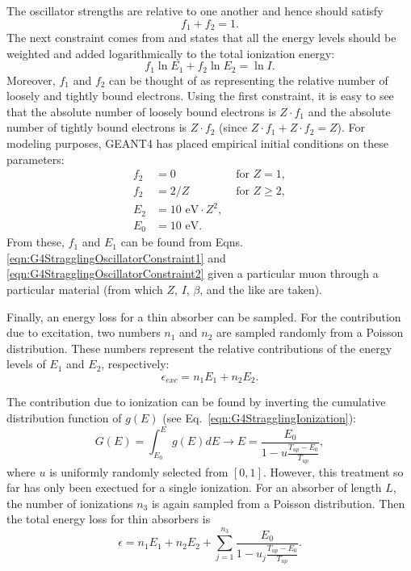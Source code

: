 The oscillator strengths are relative to one another and hence should satisfy
\begin{equation}\label{eqn:G4StragglingOscillatorConstraint1}
f_1+f_2=1.
\end{equation}
The next constraint comes from \cite{bichsel1988} and states that all the energy levels should be weighted and added logarithmically to the total ionization energy:
\begin{equation}\label{eqn:G4StragglingOscillatorConstraint2}
f_1 \ln E_1 + f_2 \ln E_2 = \ln I.
\end{equation}
Moreover, $f_1$ and $f_2$ can be thought of as representing the relative number of loosely and tightly bound electrons. Using the first constraint, it is easy to see that the absolute number of loosely bound electrons is $Z\cdot f_1$ and the absolute number of tightly bound electrons is $Z\cdot f_2$ (since $Z\cdot f_1+Z\cdot f_2=Z$). For modeling purposes, GEANT4 has placed empirical initial conditions on these parameters:
\begin{align} \label{eqn:G4StragglingOscillatorConstraint3}
f_2 & = 0 & \text{   for   } Z=1,\\
f_2 & = 2/Z & \text{     for     } Z\ge 2,\\
E_2 & = 10 \text{ eV}\cdot Z^2,\\
E_0 &= 10 \text{ eV}.
\end{align}
From these, $f_1$ and $E_1$ can be found from Eqns. \ref{eqn:G4StragglingOscillatorConstraint1} and \ref{eqn:G4StragglingOscillatorConstraint2} given a particular muon through a particular material (from which $Z$, $I$, $\beta$, and the like are taken).

Finally, an energy loss for a thin absorber can be sampled. For the contribution due to excitation, two numbers $n_1$ and $n_2$ are sampled randomly from a Poisson distribution. These numbers represent the relative contributions of the energy levels of $E_1$ and $E_2$, respectively:
\begin{equation}\nonumber
\epsilon_{exc}=n_1 E_1 + n_2 E_2.
\end{equation}

The contribution due to ionization can be found by inverting the cumulative distribution function of $g(E)$ (see Eq.~\eqref{eqn:G4StragglingIonization}):
\begin{equation}\nonumber
G(E)=\int_{E_0}^E g(E) dE \rightarrow E=\frac{E_0}{1-u\frac{T_{up}-E_0}{T_{up}}},
\end{equation}
where $u$ is uniformly randomly selected from $[0,1]$. However, this treatment so far has only been exectued for a single ionization. For an absorber of length $L$, the number of ionizations $n_3$ is again sampled from a Poisson distribution. Then the total energy loss for thin absorbers is
\begin{equation}\label{G4StragglingThin}
\epsilon = n_1 E_1 + n_2 E_2 + \sum_{j=1}^{n_3} \frac{E_0}{1-u_j \frac{T_{up}-E_0}{T_{up}}}.
\end{equation}

